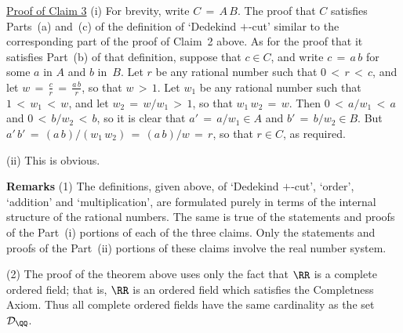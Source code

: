 {        \underline{Proof of Claim 3} (i) For brevity, write $C \,=\, A\,B$. The proof that $C$ satisfies Parts~(a) and~(c)
    of the definition of `Dedekind $+$-cut' similar to the corresponding part of the proof of Claim~2 above.
    As for the proof that it satisfies Part~(b) of that definition, suppose that $c{\in}C$, and write $c \,=\, a\,b$ for some $a$ in $A$ and $b$ in~$B$.
    Let $r$ be any rational number such that $0\,<\,r\,<\,c$, and let $w \,=\, {\displaystyle \frac{c}{r} \,=\, \frac{a\,b}{r}}$, so that $w\,>\,1$.
    Let $w_{1}$ be any rational number such that $1\,<\,w_{1}\,<\,w$, and let $w_{2} \,=\, w/w_{1}\,>\,1$, so that $w_{1}\,w_{2} \,=\, w$.
    Then $0\,<\,a/w_{1}\,<\,a$ and $0\,<\,b/w_{2}\,<\,b$, so it is clear that $a' \,=\, a/w_{1}{\in}A$ and $b' \,=\, b/w_{2}{\in}B$.
    But $a'\,b' \,=\, (a\,b)/(w_{1}\,w_{2}) \,=\, (a\,b)/w \,=\, r$, so that $r{\in}C$, as required.

        (ii) This is obvious.

\V

        


        {\bf Remarks} (1) The definitions, given above, of `Dedekind $+$-cut', `order', `addition' and `multiplication',
    are formulated purely in terms of the internal structure of the rational numbers.
    The same is true of the statements and proofs of the Part~(i) portions of each of the three claims.
    Only the statements and proofs of the Part~(ii) portions of these claims involve the real number system.

\V

        (2) The proof of the theorem above uses only the fact that ${\RR}$ is a complete ordered field;
    that is, ${\RR}$ is an ordered field which satisfies the Completness Axiom. Thus all complete ordered fields have the same cardinality as the set~${\cal D}_{{\QQ}}$. 



}
